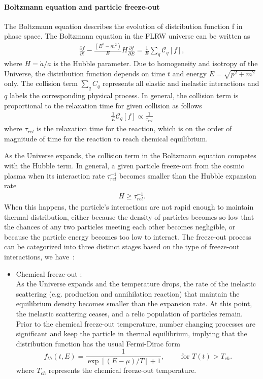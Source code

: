 {\paragraph{Boltzmann equation and particle freeze-out}
The Boltzmann equation describes the evolution of distribution function f in phase space. The Boltzmann equation in the FLRW universe can be written as
\begin{align}
\frac{\partial f}{\partial t}-\frac{\left(E^2-m^2\right)}{E}H\frac{\partial f}{\partial E}=\frac{1}{E}\sum_{q}\mathcal{C}_q[f],
\end{align}
where $H=\dot{a}/a$ is the Hubble parameter. Due to homogeneity and isotropy of the Universe, the distribution function depends on time $t$ and energy $E=\sqrt{p^2+m^2}$ only. The collision term $\sum_qC_q$ represents all elastic and inelastic interactions and $q$ labels the corresponding physical process. In general, the collision term is proportional to the relaxation time for given collision as follows \cite{Anderson:1974nyl}
\begin{align}
\frac{1}{E}\mathcal{C}_q[f]\propto\frac{1}{\tau_{rel}}
\end{align}
where $\tau_{rel}$ is the relaxation time for the reaction, which is on the order of magnitude of time for the reaction to reach chemical equilibrium. 


As the Universe expands, the collision term in the Boltzmann equation competes with the Hubble term. In general, a given particle freeze-out from the cosmic plasma when its interaction rate $\tau_{rel}^{-1}$ becomes smaller than the Hubble expansion rate
\begin{align}
H\geqslant\tau_{rel}^{-1}.
\end{align}
When this happens, the particle's interactions are not rapid enough to maintain thermal distribution, either because the density of particles becomes so low that the chances of any two particles meeting each other becomes negligible, or because the particle energy becomes too low to interact. The freeze-out process can be categorized into three distinct stages based on the type of freeze-out interactions, we have~\cite{Birrell:2012gg,Rafelski:2023emw}:

\begin{itemize}
\item Chemical freeze-out :\\
As the Universe expands and the temperature drops, the rate of the inelastic scattering (e.g. production and annihilation reaction) that maintain the equilibrium density becomes smaller than the expansion rate. At this point, the inelastic scattering ceases, and a relic population of particles remain. Prior to the chemical freeze-out temperature, number changing processes are significant and keep the particle in thermal equilibrium, implying that the distribution function has the usual Fermi-Dirac form 
\begin{equation}\label{equilibrium}
f_{th}(t,E)=\frac{1}{\exp[(E-\mu)/T]+1},\qquad \text{ for } T(t)> T_{ch}.
\end{equation}
where $T_{ch}$ represents the chemical freeze-out temperature.



\end{itemize}}
